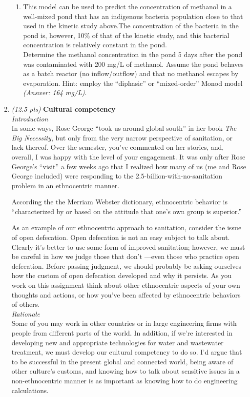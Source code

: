 \documentclass[12pt,letterpaper]{article}
\begin{document}
\begin{enumerate}
\begin{enumerate}
\item This model can be used to predict the concentration of methanol in a well-mixed pond that has an indigenous bacteria population close to that used in the kinetic study above.The concentration of the bacteria in the pond is, however, 10\% of that of the kinetic study, and this bacterial concentration is relatively constant in the pond.\\

Determine the methanol concentration in the pond 5 days after the pond was contaminated with 200 mg/L of methanol. Assume the pond behaves as a batch reactor (no inflow/outflow) and that no methanol escapes by evaporation. Hint: employ the ``diphasic'' or ``mixed-order'' Monod model \emph{(Answer: 164 mg/L)}.

\end{enumerate}

\item \emph{(12.5 pts)}  \textbf{\large{Cultural competency}}\\

\emph{\large{Introduction}}\\
In some ways, Rose George ``took us around global south'' in her book \emph{The Big Necessity}, but only from the very narrow perspective of sanitation, or lack thereof. Over the semester, you've commented on her stories, and, overall, I was happy with the level of your engagement.  It was only after Rose George's ``visit'' a few weeks ago that I realized how many of us (me and Rose George included) were responding to the 2.5-billion-with-no-sanitation problem in an ethnocentric manner.

According the the Merriam Webster dictionary, ethnocentric behavior is ``characterized by or based on the attitude that one's own group is superior.'' 

As an example of our ethnocentric approach to sanitation, consider the issue of open defecation.  Open defecation is not an easy subject to talk about.  Clearly it's better to use some form of improved sanitation; however, we must be careful in how we judge those that don't ---even those who practice open defecation.  Before passing judgment, we should probably be asking ourselves how the custom of open defecation developed and why it persists. As you work on this assignment think about other ethnocentric aspects of your own thoughts and actions, or how you've been affected by ethnocentric behaviors of others.\\

\emph{\large{Rationale}}\\
Some of you may work in other countries or in large engineering firms with people from different parts of the world. In addition, if we're interested in developing new and appropriate technologies for water and wastewater treatment, we must develop our cultural competency to do so.  I'd argue that to be successful in the present global and connected world, being aware of other culture's customs, and knowing how to talk about sensitive issues in a non-ethnocentric manner is as important as knowing how to do engineering calculations.\\


\end{enumerate}
\end{document}
